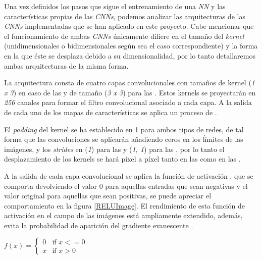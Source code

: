 \begin{enumerate}
                Una vez definidos los pasos que sigue el entrenamiento de una \textit{NN} y las características propias de las \textit{CNNs}, podemos analizar las arquitecturas de las \textit{CNNs} implementadas que se han aplicado en este proyecto. Cabe mencionar que el funcionamiento de ambas \textit{CNNs} únicamente difiere en el tamaño del \textit{kernel} (unidimensionales o bidimensionales según sea el caso correspondiente) y la forma en la que éste se desplaza debido a su dimensionalidad, por lo tanto detallaremos ambas arquitecturas de la misma forma.

                La arquitectura consta de cuatro capas convolucionales con tamaños de kernel (\textit{1 x 3}) en caso de las  y de tamaño (\textit{3 x 3}) para las . Estos kernels se proyectarán en \textit{256} canales para formar el filtro convolucional asociado a cada capa. A la salida de cada uno de los mapas de características se aplica un proceso de .

                El \textit{padding} del kernel se ha establecido en 1 para ambos tipos de redes, de tal forma que las convoluciones se aplícarán añadiendo ceros en los ĺímites de las imágenes, y los \textit{strides} en (\textit{1}) para las  y (\textit{1, 1}) para las , por lo tanto el desplazamiento de los kernels se hará píxel a píxel tanto en las  como en las .

                A la salida de cada capa convolucional se aplica la función de activación , que se comporta devolviendo el valor $0$ para aquellas entradas que sean negativas y el valor original para aquellas que sean positivas, se puede apreciar el comportamiento en la figura \ref{RELUImage}. El rendimiento de esta función de activación en el campo de las imágenes está ampliamente extendido, además, evita la probabilidad de aparición del gradiente evanescente \cite{GradientVanishingRelu}.

                \begin{center}
                    $f(x) = \left\{
                                   \begin{array}{lr}
                                     0 & \text{if } x<=0\\
                                     x & \text{if } x>0
                                   \end{array}
                            \right.$
                \end{center}


\end{enumerate}
